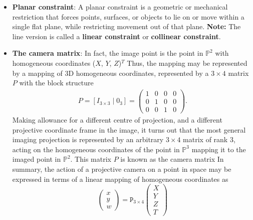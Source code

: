\documentclass{report}
\begin{document}
\begin{itemize}
            \bigbreak \noindent 
            If we consider points in $\mathbb{P}^{3}$ written in terms of homogeneous coordinates ($X$, $ Y$, $ Z$, $ T$)$^{T}$ and let the centre of projection be the origin $(0, 0, 0, 1)^{\mathsf{T}}$, then we see that the set of all points ($X$, $ Y$, $ Z$, $ T$)$^{T}$ for fixed $X$, $Y$ and $Z$, but varying $T$ form a single ray passing through the point centre of projection, and hence all mapping to the same point. Thus, the final coordinate of ($X$, $ Y$, $ Z$, $ T$)$^{T}$ is irrelevant to where the point is imaged.
            \bigbreak \noindent 
            Recall that  scaling $X,$ $Y,$ $Z$ by $k$ is mathematically identical to keeping $X,$ $Y,$ $Z$ fixed and dividing $T$ by $k$.
            \bigbreak \noindent 
        \item \textbf{Planar constraint}: A planar constraint is a geometric or mechanical restriction that forces points, surfaces, or objects to lie on or move within a single flat plane, while restricting movement out of that plane. 
            \bigbreak \noindent 
            \textbf{Note:} The line version is called a \textbf{linear constraint} or \textbf{collinear constraint}.
        \item \textbf{The camera matrix}: In fact, the image point is the point in $\mathbb{P}^{2}$ with homogeneous coordinates ($X$, $ Y$, $ Z$)$^{T}$
            \bigbreak \noindent 
            Thus, the mapping may be represented by a mapping of 3D homogeneous coordinates, represented by a $3\times 4$ matrix $P$ with the block structure
            \begin{align*}
                P = [I_{3\times3}\mid 0_{3}] = \begin{pmatrix} 1 & 0 & 0 & 0\\ 0 & 1 & 0 & 0 \\ 0 & 0 & 1 & 0 \end{pmatrix}
            .\end{align*}
            Making allowance for a different centre of projection, and a different projective coordinate frame in the image, it turns out that the most general imaging projection is represented by an arbitrary $3\times 4$ matrix of rank 3, acting on the homogeneous coordinates of the point in $\mathbb{P}^{3}$ mapping it to the imaged point in $\mathbb{P}^{2}$. This matrix $P$ is known as the camera matrix
            \bigbreak \noindent 
            In summary, the action of a projective camera on a point in space may be expressed in terms of a linear mapping of homogeneous coordinates as
            \[\begin{pmatrix}x\\y\\w\end{pmatrix}=\mathtt{P}_{3\times 4}\begin{pmatrix} X \\ Y \\ Z \\ T \end{pmatrix}\]

\end{itemize}
\end{document}
